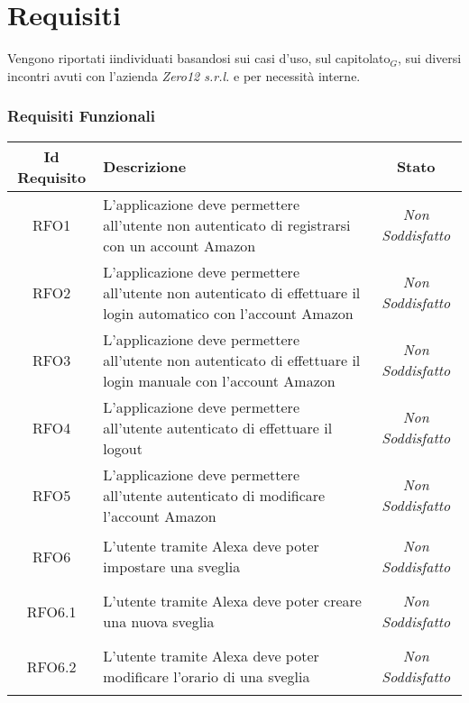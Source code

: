 \chapter{Requisiti}
Vengono riportati iindividuati basandosi sui casi d'uso, sul capitolato$_{G}$, sui diversi incontri avuti con l'azienda \textit{Zero12 s.r.l.} e per necessità interne. \\


\subsection{Requisiti Funzionali}
\normalsize
\begin{longtable}{|c|>{\centering}m{7cm}|c|}
	\hline 
	\textbf{Id Requisito} & \textbf{Descrizione} & \textbf{Stato}\\
	\hline
	\endhead
	\hypertarget{RFO1}{RFO1} & L'applicazione deve permettere all'utente non autenticato di registrarsi con un account Amazon & \textit{Non Soddisfatto}\\ \hline
	
	\hypertarget{RFO2}{RFO2} & L'applicazione deve permettere all'utente non autenticato di effettuare il login automatico con l'account Amazon & \textit{Non Soddisfatto}\\ \hline
	
	\hypertarget{RFO3}{RFO3} & L'applicazione deve permettere all'utente non autenticato di effettuare il login manuale con l'account Amazon & \textit{Non Soddisfatto}\\ \hline
	
	\hypertarget{RFO4}{RFO4} & L'applicazione deve permettere all'utente autenticato di effettuare il logout & \textit{Non Soddisfatto}\\ \hline
	
	\hypertarget{RFO5}{RFO5} & L'applicazione deve permettere all'utente autenticato di modificare l'account Amazon & \textit{Non Soddisfatto}\\ \hline
	
	\hypertarget{RFO6}{RFO6} & L'utente tramite Alexa deve poter impostare una sveglia & \textit{Non Soddisfatto}\\ \hline
	
	\hypertarget{RFO6.1}{RFO6.1} & L'utente tramite Alexa deve poter creare una nuova sveglia & \textit{Non Soddisfatto}\\ \hline
	
	\hypertarget{RFO6.2}{RFO6.2} & L'utente tramite Alexa deve poter modificare l'orario di una sveglia & \textit{Non Soddisfatto}\\ \hline
	

\end{longtable}
